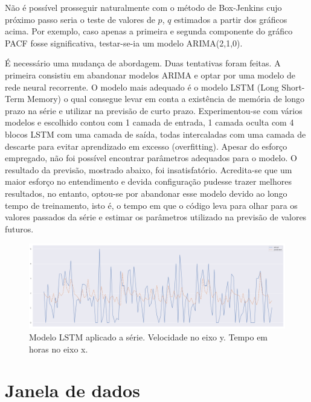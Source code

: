 \documentclass[
	12pt,				%
	openright,			%
	oneside,			%
	a4paper,			%
	english,			%
	french,				%
	spanish,			%
	brazil				%
	]{abntex2}
\begin{document}
Não é possível prosseguir naturalmente com o método de Box-Jenkins cujo próximo passo seria o teste de valores de $p$, $q$ estimados a partir dos gráficos acima. Por exemplo, caso apenas a primeira e segunda componente do gráfico PACF fosse significativa, testar-se-ia um modelo ARIMA(2,1,0).

É necessário uma mudança de abordagem. Duas tentativas foram feitas. A primeira consistiu em abandonar modelos ARIMA e optar por uma modelo de rede neural recorrente. O modelo mais adequado é o modelo LSTM (Long Short-Term Memory) o qual consegue levar em conta a existência de memória de longo prazo na série e utilizar na previsão de curto prazo. Experimentou-se com vários modelos e escolhido contou com 1 camada de entrada, 1 camada oculta com 4 blocos LSTM com uma camada de saída, todas intercaladas com uma camada de descarte para evitar aprendizado em excesso (overfitting). Apesar do esforço empregado, não foi possível encontrar parâmetros adequados para o modelo. O resultado da previsão, mostrado abaixo, foi insatisfatório. Acredita-se que um maior esforço no entendimento e devida configuração pudesse trazer melhores resultados, no entanto, optou-se por abandonar esse modelo devido ao longo tempo de treinamento, isto é, o tempo em que o código leva para olhar para os valores passados da série e estimar os parâmetros utilizado na previsão de valores futuros.

\begin{figure}[h]
    \centering
	\includegraphics[width=\textwidth]{lstm.png}
	\caption{Modelo LSTM aplicado a série. Velocidade no eixo y. Tempo em horas no eixo x.}
\end{figure}
\FloatBarrier 

\section{Janela de dados}\label{janela}
\end{document}
